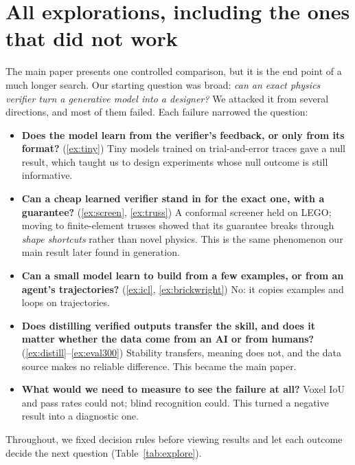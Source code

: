 \documentclass{article}
\begin{document}
\section{All explorations, including the ones that did not work}
\label{app:explorations}

The main paper presents one controlled comparison, but it is the end point of a much longer search. Our starting question was broad: \emph{can an exact physics verifier turn a generative model into a designer?} We attacked it from several directions, and most of them failed. Each failure narrowed the question:
\begin{itemize}\itemsep0pt
\item \textbf{Does the model learn from the verifier's feedback, or only from its format?} (\ref{ex:tiny}) Tiny models trained on trial-and-error traces gave a null result, which taught us to design experiments whose null outcome is still informative.
\item \textbf{Can a cheap learned verifier stand in for the exact one, with a guarantee?} (\ref{ex:screen}, \ref{ex:truss}) A conformal screener held on LEGO; moving to finite-element trusses showed that its guarantee breaks through \emph{shape shortcuts} rather than novel physics. This is the same phenomenon our main result later found in generation.
\item \textbf{Can a small model learn to build from a few examples, or from an agent's trajectories?} (\ref{ex:icl}, \ref{ex:brickwright}) No: it copies examples and loops on trajectories.
\item \textbf{Does distilling verified outputs transfer the skill, and does it matter whether the data come from an AI or from humans?} (\ref{ex:distill}--\ref{ex:eval300}) Stability transfers, meaning does not, and the data source makes no reliable difference. This became the main paper.
\item \textbf{What would we need to measure to see the failure at all?} Voxel IoU and pass rates could not; blind recognition could. This turned a negative result into a diagnostic one.
\end{itemize}
Throughout, we fixed decision rules before viewing results and let each outcome decide the next question (Table~\ref{tab:explore}).
\end{document}
